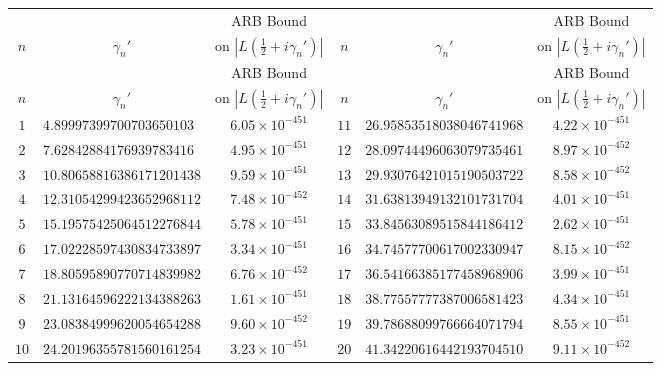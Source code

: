 \documentclass[12pt,reqno]{amsart}
\theoremstyle{plain}
\theoremstyle{definition}
\theoremstyle{remark}
\begin{document}
\renewcommand{\arraystretch}{1.05}\footnotesize
\begin{longtable}{clc|clc}
\toprule
 & & \multicolumn{1}{c}{ARB Bound} &
 & & \multicolumn{1}{c}{ARB Bound} \\
$n$ & \multicolumn{1}{c}{$\gamma_n'$} & \multicolumn{1}{c}{on $|L(\tfrac{1}{2}+i\gamma_n')|$} &
$n$ & \multicolumn{1}{c}{$\gamma_n'$} & \multicolumn{1}{c}{on $|L(\tfrac{1}{2}+i\gamma_n')|$} \\
\midrule
\endfirsthead
\toprule
 & & \multicolumn{1}{c}{ARB Bound} &
 & & \multicolumn{1}{c}{ARB Bound} \\
$n$ & \multicolumn{1}{c}{$\gamma_n'$} & \multicolumn{1}{c}{on $|L(\tfrac{1}{2}+i\gamma_n')|$} &
$n$ & \multicolumn{1}{c}{$\gamma_n'$} & \multicolumn{1}{c}{on $|L(\tfrac{1}{2}+i\gamma_n')|$} \\
\midrule
\endhead
\bottomrule
\endlastfoot
$1$ & $4.89997399700703650103$ & $6.05 \times 10^{-451}$ & $11$ & $26.95853518038046741968$ & $4.22 \times 10^{-451}$ \\
$2$ & $7.62842884176939783416$ & $4.95 \times 10^{-451}$ & $12$ & $28.09744496063079735461$ & $8.97 \times 10^{-452}$ \\
$3$ & $10.80658816386171201438$ & $9.59 \times 10^{-451}$ & $13$ & $29.93076421015190503722$ & $8.58 \times 10^{-452}$ \\
$4$ & $12.31054299423652968112$ & $7.48 \times 10^{-452}$ & $14$ & $31.63813949132101731704$ & $4.01 \times 10^{-451}$ \\
$5$ & $15.19575425064512276844$ & $5.78 \times 10^{-451}$ & $15$ & $33.84563089515844186412$ & $2.62 \times 10^{-451}$ \\
$6$ & $17.02228597430834733897$ & $3.34 \times 10^{-451}$ & $16$ & $34.74577700617002330947$ & $8.15 \times 10^{-452}$ \\
$7$ & $18.80595890770714839982$ & $6.76 \times 10^{-452}$ & $17$ & $36.54166385177458968906$ & $3.99 \times 10^{-451}$ \\
$8$ & $21.13164596222134388263$ & $1.61 \times 10^{-451}$ & $18$ & $38.77557777387006581423$ & $4.34 \times 10^{-451}$ \\
$9$ & $23.08384999620054654288$ & $9.60 \times 10^{-452}$ & $19$ & $39.78688099766664071794$ & $8.55 \times 10^{-451}$ \\
$10$ & $24.20196355781560161254$ & $3.23 \times 10^{-451}$ & $20$ & $41.34220616442193704510$ & $9.11 \times 10^{-452}$ \\

\end{longtable}
\normalsize
\end{document}
